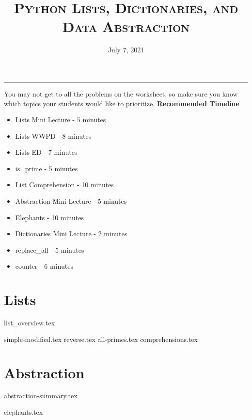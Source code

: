 \documentclass{exam}
\title{\textsc{Python Lists, Dictionaries, and Data Abstraction}}
\date{July 7, 2021}
\begin{document}
\maketitle
\rule{\textwidth}{0.15em}
\fontsize{12}{15}\selectfont


\begin{guide}
You may not get to all the problems on the worksheet, so make sure you know which topics your students would like to prioritize.
\newline
    \textbf{Recommended Timeline}
    \begin{itemize}
        \item Lists Mini Lecture - 5 minutes
        \item Lists WWPD - 8 minutes
        \item Lists ED - 7 minutes
        \item is\_prime - 5 minutes
        \item List Comprehension - 10 minutes
        \item Abstraction Mini Lecture - 5 minutes
        \item Elephants - 10 minutes
        \item Dictionaries Mini Lecture - 2 minutes
        \item replace\_all - 5 minutes
        \item counter - 6 minutes
    \end{itemize}
\end{guide}

\section{Lists}
{list_overview.tex}
\begin{questions}
{simple-modified.tex}
{reverse.tex}
{all-primes.tex}
{comprehensions.tex}
\end{questions}

\newpage
\section{Abstraction}
{abstraction-summary.tex}
\begin{questions}
{elephants.tex}
\end{questions}
\end{document}
